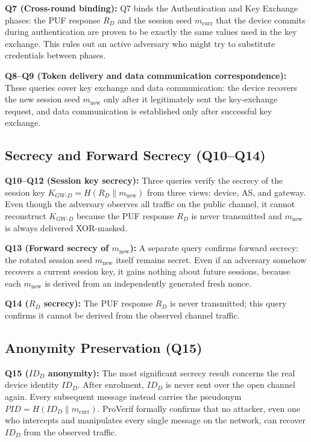 \documentclass[12pt,a4paper]{report}
\begin{document}
\textbf{Q7 (Cross-round binding):}
Q7 binds the Authentication and Key Exchange phases: the PUF response $R_D$ and
the session seed $m_{\mathrm{curr}}$ that the device commits during authentication
are proven to be exactly the same values used in the key exchange.
This rules out an active adversary who might try to substitute credentials between
phases.

\textbf{Q8--Q9 (Token delivery and data communication correspondence):}
These queries cover key exchange and data communication: the device recovers the new
session seed $m_{\mathrm{new}}$ only after it legitimately sent the key-exchange
request, and data communication is established only after successful key exchange.

\subsection{Secrecy and Forward Secrecy (Q10--Q14)}

\textbf{Q10--Q12 (Session key secrecy):}
Three queries verify the secrecy of the session key
$K_{GW\text{-}D} = H(R_D \| m_{\mathrm{new}})$ from three views: device, AS, and
gateway.
Even though the adversary observes all traffic on the public channel, it cannot
reconstruct $K_{GW\text{-}D}$ because the PUF response $R_D$ is never transmitted
and $m_{\mathrm{new}}$ is always delivered XOR-masked.

\textbf{Q13 (Forward secrecy of $m_{\mathrm{new}}$):}
A separate query confirms forward secrecy: the rotated session seed $m_{\mathrm{new}}$
itself remains secret.
Even if an adversary somehow recovers a current session key, it gains nothing about
future sessions, because each $m_{\mathrm{new}}$ is derived from an independently
generated fresh nonce.

\textbf{Q14 ($R_D$ secrecy):}
The PUF response $R_D$ is never transmitted; this query confirms it cannot be derived
from the observed channel traffic.

\subsection{Anonymity Preservation (Q15)}

\textbf{Q15 ($ID_D$ anonymity):}
The most significant secrecy result concerns the real device identity $ID_D$.
After enrolment, $ID_D$ is never sent over the open channel again.
Every subsequent message instead carries the pseudonym
$\mathit{PID} = H(ID_D \| m_{\mathrm{curr}})$.
ProVerif formally confirms that no attacker, even one who intercepts and manipulates
every single message on the network, can recover $ID_D$ from the observed traffic.
\end{document}
